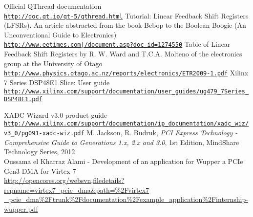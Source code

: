 \begin{thebibliography}{9}
  Official QThread documentation\\
  \href{http://doc.qt.io/qt-5/qthread.html}{\nolinkurl{http://doc.qt.io/qt-5/qthread.html}}
  Tutorial: Linear Feedback Shift Registers (LFSRs). An article abstracted from the book Bebop to the Boolean Boogie (An Unconventional Guide to Electronics)\\
  \href{http://www.eetimes.com/document.asp?doc_id=1274550}{\nolinkurl{http://www.eetimes.com|/document.asp?doc\_id=1274550}}
  Table of Linear Feedback Shift Registers by R. W. Ward and T.C.A. Molteno of the electronics group at the University of Otago\\
  \href{http://www.physics.otago.ac.nz/reports/electronics/ETR2009-1.pdf}{\nolinkurl{http://www.physics.otago.ac.nz/reports/electronics/ETR2009-1.pdf}}
  Xilinx 7 Series DSP48E1 Slice: User guide\\
  \href{http://www.xilinx.com/support/documentation/user_guides/ug479_7Series_DSP48E1.pdf}{\nolinkurl{http://www.xilinx.com/support/documentation/user\_guides/ug479\_7Series\_DSP48E1.pdf}}	
  
  XADC Wizard v3.0 product guide\\
  \href{http://www.xilinx.com/support/documentation/ip_documentation/xadc_wiz/v3_0/pg091-xadc-wiz.pdf}{\nolinkurl{http://www.xilinx.com/support/documentation/ip\_documentation/xadc\_wiz/v3\_0/pg091-xadc-wiz.pdf}}
 M. Jackson, R. Budruk, \textit{PCI Express Technology - Comprehensive Guide to Generations 1.x, 2.x and 3.0}, 1st Edition, MindShare Technology Series, 2012\\
  Oussama el Kharraz Alami - Development of an application for Wupper a PCIe Gen3 DMA for Virtex 7\\
  \href{http://opencores.org/websvn,filedetails?repname=virtex7\_pcie\_dma\&path=\%2Fvirtex7_pcie_dma\%2Ftrunk\%2Fdocumentation\%2Fexample\_application\%2Finternship-wupper.pdf}{http://opencores.org/websvn,filedetails?repname=virtex7\_pcie\_dma\&path=\%2Fvirtex7 \_pcie\_dma\%2Ftrunk\%2Fdocumentation\%2Fexample\_application\%2Finternship-wupper.pdf}
\end{thebibliography}
\newpage
{}
\listoffigures
{}
\listoftables
\newpage
